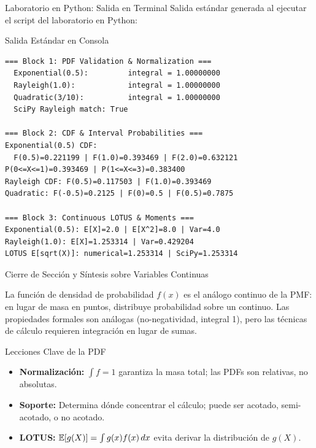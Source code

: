 \documentclass[10pt, aspectratio=169]{beamer}
\begin{document}
\begin{frame}[fragile]{Laboratorio en Python: Salida en Terminal}
  \scriptsize
  Salida estándar generada al ejecutar el script del laboratorio en Python:
  \vspace{0.02cm}
  \begin{block}{Salida Estándar en Consola}
    \fontsize{4pt}{5pt}\selectfont
    \begin{verbatim}
=== Block 1: PDF Validation & Normalization ===
  Exponential(0.5):         integral = 1.00000000
  Rayleigh(1.0):            integral = 1.00000000
  Quadratic(3/10):          integral = 1.00000000
  SciPy Rayleigh match: True

=== Block 2: CDF & Interval Probabilities ===
Exponential(0.5) CDF:
  F(0.5)=0.221199 | F(1.0)=0.393469 | F(2.0)=0.632121
P(0<=X<=1)=0.393469 | P(1<=X<=3)=0.383400
Rayleigh CDF: F(0.5)=0.117503 | F(1.0)=0.393469
Quadratic: F(-0.5)=0.2125 | F(0)=0.5 | F(0.5)=0.7875

=== Block 3: Continuous LOTUS & Moments ===
Exponential(0.5): E[X]=2.0 | E[X^2]=8.0 | Var=4.0
Rayleigh(1.0): E[X]=1.253314 | Var=0.429204
LOTUS E[sqrt(X)]: numerical=1.253314 | SciPy=1.253314
    \end{verbatim}
  \end{block}
\end{frame}

\begin{frame}{Cierre de Sección y Síntesis sobre Variables Continuas}
  \begin{reflexion}
    La función de densidad de probabilidad $f(x)$ es el análogo continuo de la PMF: en lugar de masa en puntos, distribuye probabilidad sobre un continuo. Las propiedades formales son análogas (no-negatividad, integral 1), pero las técnicas de cálculo requieren integración en lugar de sumas.
  \end{reflexion}

  \vspace{0.2cm}
  \pause
  \begin{block}{Lecciones Clave de la PDF}
    \begin{itemize}\itemsep=0.08cm
      \item \textbf{Normalización:} $\int f = 1$ garantiza la masa total; las PDFs son relativas, no absolutas.
      \item \textbf{Soporte:} Determina dónde concentrar el cálculo; puede ser acotado, semi-acotado, o no acotado.
      \item \textbf{LOTUS:} $\mathbb{E}[g(X)] = \int g(x) f(x)\,dx$ evita derivar la distribución de $g(X)$.
    \end{itemize}
  \end{block}
\end{frame}
\end{document}
